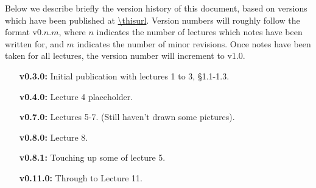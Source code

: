 Below we describe briefly the version history of this document, based on
versions which have been published at \url{\thisurl}. Version numbers will
roughly follow the format v0.$n$.$m$, where $n$ indicates the number of
lectures which notes have been written for, and $m$ indicates the number of
minor revisions. Once notes have been taken for all lectures, the version
number will increment to v1.0.

\begin{enumerate}
\item[\bf v0.3.0:] Initial publication with lectures 1 to 3, \S1.1-1.3.
\item[\bf v0.4.0:] Lecture 4 placeholder.
\item[\bf v0.7.0:] Lectures 5-7. (Still haven't drawn some pictures).
\item[\bf v0.8.0:] Lecture 8.
\item[\bf v0.8.1:] Touching up some of lecture 5.
\item[\bf v0.11.0:] Through to Lecture 11.
\end{enumerate}
